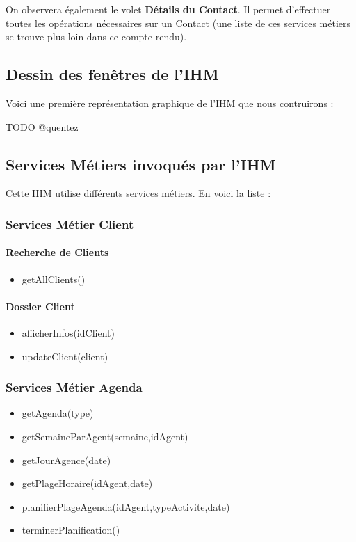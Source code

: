 On observera également le volet \textbf{Détails du Contact}. Il permet d'effectuer toutes les
opérations nécessaires sur un Contact (une liste de ces services métiers se trouve plus loin
dans ce compte rendu).

\subsection{Dessin des fenêtres de l'IHM}

Voici une première représentation graphique de l'IHM que nous contruirons :

TODO @quentez

\subsection{Services Métiers invoqués par l'IHM}

Cette IHM utilise différents services métiers. En voici la liste :

\subsubsection{Services Métier Client}

\paragraph{Recherche de Clients}

\begin{itemize}
\item getAllClients()
\end{itemize}

\paragraph{Dossier Client}

\begin{itemize}
\item afficherInfos(idClient)
\item updateClient(client)
\end{itemize}

\subsubsection{Services Métier Agenda}

\begin{itemize}
\item getAgenda(type)
\item getSemaineParAgent(semaine,idAgent)
\item getJourAgence(date)
\item getPlageHoraire(idAgent,date)
\item planifierPlageAgenda(idAgent,typeActivite,date)
\item terminerPlanification()
\end{itemize}

